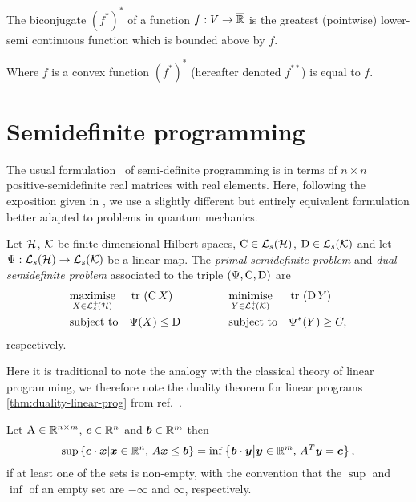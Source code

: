 \begin{thm}
  The biconjugate $(f^{*})^*$ of a function $f:V\to\overline{\mathbb{R}}$ is the greatest (pointwise) lower-semi continuous function which is bounded above by $f$.
\end{thm}

Where $f$ is a convex function $(f^*)^*$ (hereafter denoted $f^{**}$) is equal to $f$.

\section{Semidefinite programming}
The usual formulation~\cites{Vandenberghe-Boyd-semidefinite} of semi-definite programming is in terms of $n\times n$ positive-semidefinite real matrices with real elements. Here, following the exposition given in \cite{w-semidefinite-prog-cb-norms}, we use a slightly different but entirely equivalent formulation better adapted to problems in quantum mechanics. 

\begin{defn}\label{defn:complex-semidefinite-program}
  Let $\mathcal{H}$, $\mathcal{K}$ be finite-dimensional Hilbert spaces, $\opc\in\saops[\hcal]$, $\opd\in\saops[\kcal]$ and let $\Psi:\saops[\hcal]\to\saops[\kcal]$ be a linear map. The \emph{primal semidefinite problem} and \emph{dual semidefinite problem}  associated to the triple $\left(\Psi, \operatorname{C}, \operatorname{D}\right)$ are
  \begin{equation}
  \begin{aligned}
    & \underset{X\in\posops[\hcal]}{\text{maximise}} & &\tr{\opc X } \qquad\qquad & & \underset{Y\in\posops[\kcal]}{\text{minimise}} & & \tr{\opd Y} \\
    & \text{subject to} & &\Psi(X) \leq \opd & & \text{subject to} & &  \Psi^*(Y) \geq C,
  \end{aligned}
  \label{eqn:semidefinite-program}
\end{equation}
respectively.
\end{defn}

Here it is traditional to note the analogy with the classical theory of linear programming,  we therefore note the duality theorem for linear programs \eqref{thm:duality-linear-prog} from ref.~\cite{schrijver-lin-int-prog}.
\begin{thm}\label{thm:duality-linear-prog}
  Let $\operatorname{A}\in\mathbb{R}^{n\times m}$, $\bm{c}\in\mathbb{R}^n$ and $\bm{b}\in\mathbb{R}^m$ then
  \begin{align}
    \sup\left\{\bm{c}\cdot \bm{x} \middle| \bm{x}\in\mathbb{R}^n,\, A \bm{x} \leq \bm{b}\right \} = \inf\left\{ \bm{b}\cdot\bm{y} \middle|\bm{y}\in\mathbb{R}^m,\, A^T \bm{y}= \bm{c}\right \},
  \end{align}
  if at least one of the sets is non-empty, with the convention that the $\sup$ and $\inf$ of an empty set are $-\infty$ and $\infty$, respectively.
\end{thm}
  
